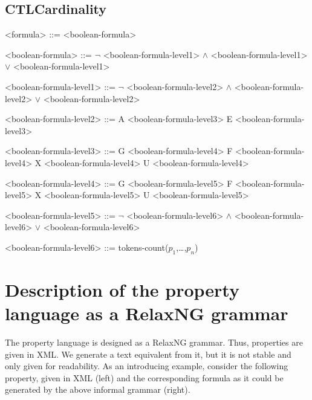 \documentclass[10pt,english,a4paper]{article}
\begin{document}
\subsection{CTLCardinality}

\begin{grammar}

<formula> ::= <boolean-formula>

<boolean-formula> ::= $\lnot$ <boolean-formula-level1>
 $\wedge$ <boolean-formula-level1>
 $\vee$ <boolean-formula-level1>

<boolean-formula-level1> ::= $\lnot$ <boolean-formula-level2>
 $\wedge$ <boolean-formula-level2>
 $\vee$ <boolean-formula-level2>

<boolean-formula-level2> ::= A <boolean-formula-level3>
\alt E <boolean-formula-level3>

<boolean-formula-level3> ::= G <boolean-formula-level4>
\alt F <boolean-formula-level4>
\alt X <boolean-formula-level4>
 U <boolean-formula-level4>

<boolean-formula-level4> ::= G <boolean-formula-level5>
\alt F <boolean-formula-level5>
\alt X <boolean-formula-level5>
 U <boolean-formula-level5>

<boolean-formula-level5> ::= $\lnot$ <boolean-formula-level6>
 $\wedge$ <boolean-formula-level6>
 $\vee$ <boolean-formula-level6>

<boolean-formula-level6> ::= tokens-count($p_1$,\dots,$p_n$)


\end{grammar}

\clearpage
\section{Description of the property language as a RelaxNG grammar}

The property language is designed as a RelaxNG grammar. Thus, properties are given in XML.
We generate a text equivalent from it, but it is not stable and only given for readability.
As an introducing example, consider the following property, given in XML (left) and the corresponding formula as it could be generated by the above informal grammar (right).
\end{document}

